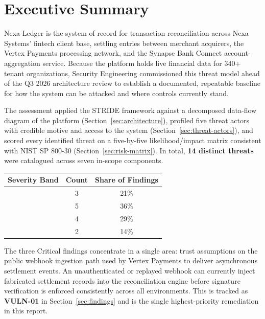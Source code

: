 \section{Executive Summary}
\label{sec:executive-summary}

Nexa Ledger is the system of record for transaction reconciliation across Nexa Systems' fintech client base, settling entries between merchant acquirers, the Vertex Payments processing network, and the Synapse Bank Connect account-aggregation service. Because the platform holds live financial data for 340+ tenant organizations, Security Engineering commissioned this threat model ahead of the Q3 2026 architecture review to establish a documented, repeatable baseline for how the system can be attacked and where controls currently stand.

The assessment applied the STRIDE framework \cite{stride_shostack} against a decomposed data-flow diagram of the platform (Section~\ref{sec:architecture}), profiled five threat actors with credible motive and access to the system (Section~\ref{sec:threat-actors}), and scored every identified threat on a five-by-five likelihood/impact matrix consistent with NIST SP 800-30 \cite{nist80030} (Section~\ref{sec:risk-matrix}). In total, \textbf{14 distinct threats} were catalogued across seven in-scope components.

\begin{center}
\begin{tabularx}{0.85\linewidth}{@{}L C C@{}}
\toprule
\textbf{Severity Band} & \textbf{Count} & \textbf{Share of Findings} \\
\midrule
\critical{} & 3 & 21\% \\
\highrisk{} & 5 & 36\% \\
\mediumrisk{} & 4 & 29\% \\
\lowrisk{} & 2 & 14\% \\
\bottomrule
\end{tabularx}
\end{center}

The three Critical findings concentrate in a single area: trust assumptions on the public webhook ingestion path used by Vertex Payments to deliver asynchronous settlement events. An unauthenticated or replayed webhook can currently inject fabricated settlement records into the reconciliation engine before signature verification is enforced consistently across all environments. This is tracked as \textbf{VULN-01} in Section~\ref{sec:findings} and is the single highest-priority remediation in this report.

